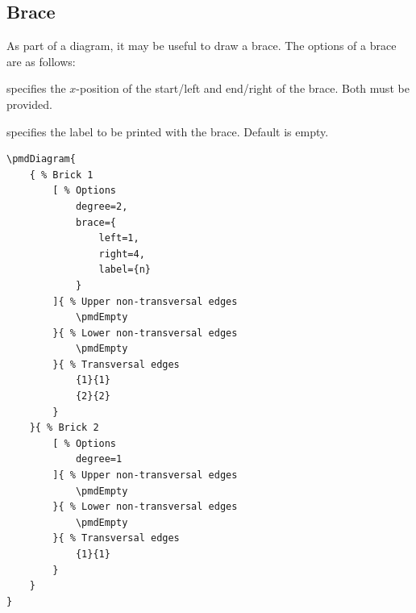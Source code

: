 \documentclass{ltxdoc}
\begin{document}
\subsection{Brace} \label{sec: brace}

As part of a diagram, it may be useful to draw a brace. The options of a brace are as follows:

specifies the \( x \)-position of the start/left and end/right of the brace. Both must be provided.

specifies the label to be printed with the brace. Default is empty.
\begin{center}
    \begin{minipage}{\dimexpr0.85\textwidth-2\fboxrule-2\fboxsep\relax}
        \begin{minipage}[c]{0.4\linewidth}
\begin{verbatim}
\pmdDiagram{
    { % Brick 1
        [ % Options
            degree=2,
            brace={
                left=1,
                right=4,
                label={n}
            }
        ]{ % Upper non-transversal edges
            \pmdEmpty
        }{ % Lower non-transversal edges
            \pmdEmpty
        }{ % Transversal edges
            {1}{1}
            {2}{2}
        }
    }{ % Brick 2
        [ % Options
            degree=1
        ]{ % Upper non-transversal edges
            \pmdEmpty
        }{ % Lower non-transversal edges
            \pmdEmpty
        }{ % Transversal edges
            {1}{1}
        }
    }
}
\end{verbatim}
        \end{minipage}
        \hfill
        \begin{minipage}[c]{0.4\linewidth}
        \end{minipage}
    \end{minipage}%
\end{center}
\begin{center}
\end{center}
\end{document}
